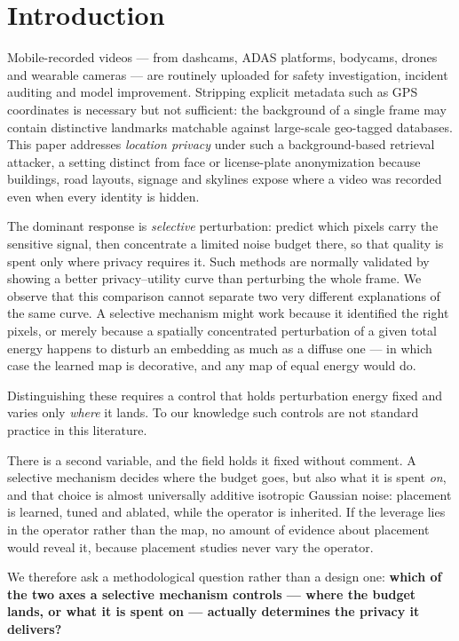 \documentclass[10pt,journal]{IEEEtran}
\begin{document}
\section{Introduction}
Mobile-recorded videos --- from dashcams, ADAS platforms, bodycams, drones and
wearable cameras --- are routinely uploaded for safety investigation, incident
auditing and model improvement. Stripping explicit metadata such as GPS
coordinates is necessary but not sufficient: the background of a single frame
may contain distinctive landmarks matchable against large-scale geo-tagged
databases. This paper addresses \emph{location privacy} under such a
background-based retrieval attacker, a setting distinct from face or
license-plate anonymization because buildings, road layouts, signage and
skylines expose where a video was recorded even when every identity is
hidden.

The dominant response is \emph{selective} perturbation: predict which pixels carry the sensitive signal, then concentrate a limited noise budget there, so that quality is spent only where privacy requires it. Such methods are normally validated by showing a better privacy--utility curve than perturbing the whole frame. We observe that this comparison cannot separate two very different explanations of the same curve. A selective mechanism might work because it identified the right pixels, or merely because a spatially concentrated perturbation of a given total energy happens to disturb an embedding as much as a diffuse one --- in which case the learned map is decorative, and any map of equal energy would do.

Distinguishing these requires a control that holds perturbation energy fixed and varies only \emph{where} it lands. To our knowledge such controls are not standard practice in this literature.

There is a second variable, and the field holds it fixed without comment. A
selective mechanism decides where the budget goes, but also what it is spent
\emph{on}, and that choice is almost universally additive isotropic Gaussian
noise: placement is learned, tuned and ablated, while the operator is
inherited. If the leverage lies in the operator rather than the map, no amount
of evidence about placement would reveal it, because placement studies never
vary the operator.

We therefore ask a methodological question rather than a design one: \textbf{which of the two axes a selective mechanism controls --- where the budget lands, or what it is spent on --- actually determines the privacy it delivers?}
\end{document}
